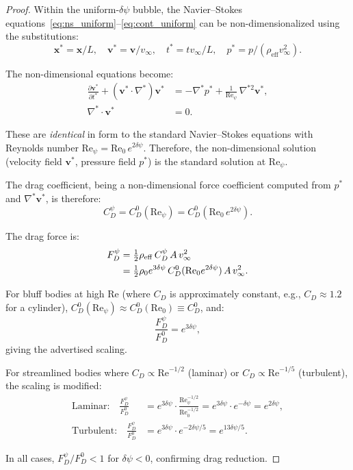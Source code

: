 \documentclass[12pt,twocolumn]{article}
\newcommand{\Reff}{\mathrm{eff}}
\newcommand{\Rey}{\mathrm{Re}}
\newcommand{\vvec}{\mathbf{v}}
\newcommand{\xvec}{\mathbf{x}}
\newcommand{\dpsi}{\delta\psi}
\newcommand{\half}{\tfrac{1}{2}}
\begin{document}
\begin{proof}
Within the uniform-$\dpsi$ bubble, the Navier--Stokes
equations~\eqref{eq:ns_uniform}--\eqref{eq:cont_uniform} can be
non-dimensionalized using the substitutions:
\begin{equation}
\xvec^* = \xvec/L,\quad \vvec^* = \vvec/v_\infty,\quad
t^* = tv_\infty/L,\quad p^* = p/(\rho_\Reff v_\infty^2).
\end{equation}

The non-dimensional equations become:
\begin{align}
\frac{\partial\vvec^*}{\partial t^*}
+ (\vvec^*\cdot\nabla^*)\vvec^*
&= -\nabla^* p^* + \frac{1}{\Rey_\psi}\,\nabla^{*2}\vvec^*,\\
\nabla^*\cdot\vvec^* &= 0.
\end{align}

These are \emph{identical} in form to the standard Navier--Stokes
equations with Reynolds number $\Rey_\psi = \Rey_0\,e^{2\dpsi}$. Therefore,
the non-dimensional solution (velocity field $\vvec^*$, pressure field
$p^*$) is the standard solution at $\Rey_\psi$.

The drag coefficient, being a non-dimensional force coefficient computed
from $p^*$ and $\nabla^*\vvec^*$, is therefore:
\begin{equation}
C_D^\psi = C_D^0(\Rey_\psi) = C_D^0(\Rey_0\,e^{2\dpsi}).
\end{equation}

The drag force is:
\begin{align}
F_D^\psi &= \half\rho_\Reff\,C_D^\psi\,A\,v_\infty^2 \notag\\
&= \half\rho_0 e^{3\dpsi}\,C_D^0(\Rey_0 e^{2\dpsi})\,A\,v_\infty^2.
\end{align}

For bluff bodies at high $\Rey$ (where $C_D$ is approximately constant,
e.g., $C_D \approx 1.2$ for a cylinder), $C_D^0(\Rey_\psi) \approx
C_D^0(\Rey_0) \equiv C_D^0$, and:
\begin{equation}
\frac{F_D^\psi}{F_D^0} = e^{3\dpsi},
\end{equation}
giving the advertised scaling.

For streamlined bodies where $C_D \propto \Rey^{-1/2}$ (laminar) or
$C_D \propto \Rey^{-1/5}$ (turbulent), the scaling is modified:
\begin{align}
\text{Laminar:}\quad \frac{F_D^\psi}{F_D^0}
&= e^{3\dpsi}\cdot\frac{\Rey_\psi^{-1/2}}{\Rey_0^{-1/2}}
= e^{3\dpsi}\cdot e^{-\dpsi} = e^{2\dpsi}, \\
\text{Turbulent:}\quad \frac{F_D^\psi}{F_D^0}
&= e^{3\dpsi}\cdot e^{-2\dpsi/5} = e^{13\dpsi/5}.
\end{align}

In all cases, $F_D^\psi/F_D^0 < 1$ for $\dpsi < 0$, confirming drag
reduction.
\end{proof}
\end{document}
